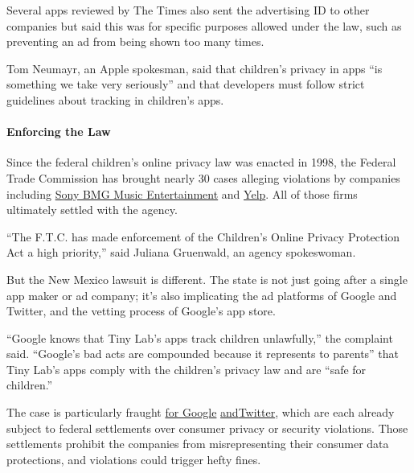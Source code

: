 Several apps reviewed by The Times also sent the advertising ID to other
companies but said this was for specific purposes allowed under the law,
such as preventing an ad from being shown too many times.

Tom Neumayr, an Apple spokesman, said that children's privacy in apps
``is something we take very seriously'' and that developers must follow
strict guidelines about tracking in children's apps.

\hypertarget{enforcing-the-law}{%
\paragraph{Enforcing the Law}\label{enforcing-the-law}}

Since the federal children's online privacy law was enacted in 1998, the
Federal Trade Commission has brought nearly 30 cases alleging violations
by companies including
\href{https://www.ftc.gov/news-events/press-releases/2008/12/sony-bmg-music-settles-charges-its-music-fan-websites-violated}{Sony
BMG Music Entertainment} and
\href{https://www.ftc.gov/news-events/press-releases/2014/09/yelp-tinyco-settle-ftc-charges-their-apps-improperly-collected}{Yelp}.
All of those firms ultimately settled with the agency.

``The F.T.C. has made enforcement of the Children's Online Privacy
Protection Act a high priority,'' said Juliana Gruenwald, an agency
spokeswoman.

But the New Mexico lawsuit is different. The state is not just going
after a single app maker or ad company; it's also implicating the ad
platforms of Google and Twitter, and the vetting process of Google's app
store.

``Google knows that Tiny Lab's apps track children unlawfully,'' the
complaint said. ``Google's bad acts are compounded because it represents
to parents'' that Tiny Lab's apps comply with the children's privacy law
and are ``safe for children.''

The case is particularly fraught
\href{https://www.ftc.gov/news-events/press-releases/2012/08/google-will-pay-225-million-settle-ftc-charges-it-misrepresented}{for
Google}
\href{https://www.ftc.gov/news-events/press-releases/2011/03/ftc-accepts-final-settlement-twitter-failure-safeguard-personal-0}{and}\href{https://www.ftc.gov/news-events/press-releases/2011/03/ftc-accepts-final-settlement-twitter-failure-safeguard-personal-0}{Twitter},
which are each already subject to federal settlements over consumer
privacy or security violations. Those settlements prohibit the companies
from misrepresenting their consumer data protections, and violations
could trigger hefty fines.

